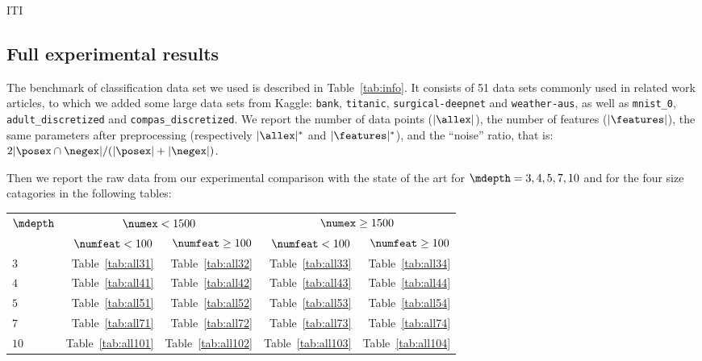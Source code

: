 \documentclass{article}
\begin{document}
\begin{table}[htbp]
\begin{center}
\begin{footnotesize}
\tabcolsep=5pt

\end{footnotesize}
\end{center}
\caption{\label{tab:iti} ITI}
\end{table}


\subsection{Full experimental results}


The benchmark of classification data set we used is described in Table~\ref{tab:info}. It consists of 51 data sets 
commonly used in related work articles, to which we added some large data sets from Kaggle: \texttt{bank}, \texttt{titanic}, \texttt{surgical-deepnet} and \texttt{weather-aus}, as well as \texttt{mnist\_0}, \texttt{adult\_discretized} and \texttt{compas\_discretized}. We report the number of data points ($|\allex|$), the number of features ($|\features|$), the same parameters after preprocessing (respectively $|\allex|^*$ and $|\features|^*$), and the ``noise'' ratio, that is: $2|\posex \cap \negex|/(|\posex|+|\negex|)$.

\medskip

Then we report the raw data from our experimental comparison with the state of the art for $\mdepth=3,4,5,7,10$ and for the four size catagories in the following tables:

\tabcolsep=10pt
\begin{center}
\begin{tabular}{lrrrr}
	\toprule
	\multirow{2}{*}{$\mdepth$}& \multicolumn{2}{c}{$\numex < 1500$} & \multicolumn{2}{c}{$\numex \geq 1500$} \\
	& $\numfeat < 100$ & $\numfeat \geq 100$ & $\numfeat < 100$ & $\numfeat \geq 100$ \\
	 \midrule
	$3$ & Table~\ref{tab:all31} & Table~\ref{tab:all32}  & Table~\ref{tab:all33}  & Table~\ref{tab:all34} \\
	$4$ & Table~\ref{tab:all41} & Table~\ref{tab:all42}  & Table~\ref{tab:all43}  & Table~\ref{tab:all44} \\
	$5$ & Table~\ref{tab:all51} & Table~\ref{tab:all52}  & Table~\ref{tab:all53}  & Table~\ref{tab:all54} \\
	$7$ & Table~\ref{tab:all71} & Table~\ref{tab:all72}  & Table~\ref{tab:all73}  & Table~\ref{tab:all74} \\
	$10$ & Table~\ref{tab:all101} & Table~\ref{tab:all102}  & Table~\ref{tab:all103}  & Table~\ref{tab:all104} \\
	\bottomrule 
\end{tabular}
\end{center}
\end{document}
